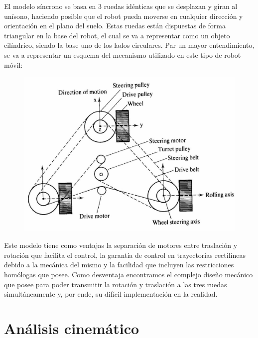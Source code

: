 \documentclass[a4paper,twoside]{article}
\begin{document}
El modelo síncrono se basa en 3 ruedas idénticas que se desplazan y giran al unísono, haciendo posible que el robot pueda moverse en cualquier dirección y orientación en el plano del suelo. Estas ruedas están dispuestas de forma triangular en la base del robot, el cual se va a representar como un objeto cilíndrico, siendo la base uno de los lados circulares. Par un mayor entendimiento, se va a representar un esquema del mecanismo utilizado en este tipo de robot móvil:\\

\begin{figure}[h!]
	\centering
	\includegraphics[width=.6\textwidth]{mecanismo_interno}
\end{figure}

Este modelo tiene como ventajas la separación de motores entre traslación y rotación que facilita el control, la garantía de control en trayectorias rectilíneas debido a la mecánica del mismo y la facilidad que incluyen las restricciones homólogas que posee. Como desventaja encontramos el complejo diseño mecánico que posee para poder transmitir la rotación y traslación a las tres ruedas simultáneamente y, por ende, su difícil implementación en la realidad.\\

\section{Análisis cinemático}
\end{document}
